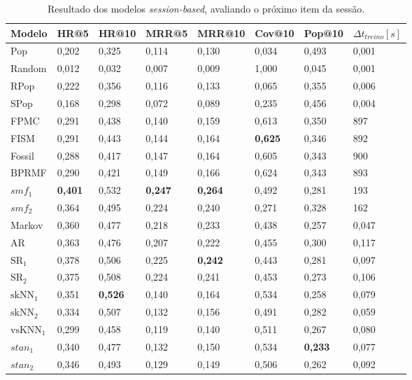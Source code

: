 \begin{table}
  \centering
  \begin{tabular}{|l|l|l|l|l|l|l|l|}
    \hline
    Modelo & HR@5 & HR@10 & MRR@5 & MRR@10 & Cov@10 & Pop@10 & $\Delta t_{treino} [s]$ \\
    \hline
    Pop & 0,202 & 0,325 & 0,114 & 0,130 & 0,034 & 0,493 & 0,001 \\
    \hline
    Random & 0,012 & 0,032 & 0,007 & 0,009 & 1,000 & 0,045 & 0,001 \\
    \hline
    RPop & 0,222 & 0,356 & 0,116 & 0,133 & 0,065 & 0,355 & 0,006 \\
    \hline
    SPop & 0,168 & 0,298 & 0,072 & 0,089 & 0,235 & 0,456 & 0,004 \\
    \hline
    FPMC & 0,291 & 0,438 & 0,140 & 0,159 & 0,613 & 0,350 & 897 \\
    \hline
    FISM & 0,291 & 0,443 & 0,144 & 0,164 & \textbf{0,625} & 0,346 & 892 \\
    \hline
    Fossil & 0,288 & 0,417 & 0,147 & 0,164 & 0,605 & 0,343 & 900 \\
    \hline
    BPRMF & 0,290 & 0,421 & 0,149 & 0,166 & 0,624 & 0,343 & 893 \\
    \hline
    $smf_{1}$ & \textbf{0,401} & 0,532 & \textbf{0,247} & \textbf{0,264} & 0,492 & 0,281 & 193 \\
    \hline
    $smf_{2}$ & 0,364 & 0,495 & 0,224 & 0,240 & 0,271 & 0,328 & 162 \\
    \hline
    Markov & 0,360 & 0,477 & 0,218 & 0,233 & 0,438 & 0,257 & 0,047 \\
    \hline
    AR & 0,363 & 0,476 & 0,207 & 0,222 & 0,455 & 0,300 & 0,117 \\
    \hline
    $\text{SR}_{1}$ & 0,378 & 0,506 & 0,225 & \textbf{0,242} & 0,443 & 0,281 & 0,097 \\
    \hline
    $\text{SR}_{2}$ & 0,375 & 0,508 & 0,224 & 0,241 & 0,453 & 0,273 & 0,106 \\
    \hline
    $\text{skNN}_{1}$ & 0,351 & \textbf{0,526} & 0,140 & 0,164 & 0,534 & 0,258 & 0,079 \\
    \hline
    $\text{skNN}_{2}$ & 0,334 & 0,507 & 0,132 & 0,156 & 0,491 & 0,282 & 0,059 \\
    \hline
    $\text{vsKNN}_{1}$ & 0,299 & 0,458 & 0,119 & 0,140 & 0,511 & 0,267 & 0,080 \\
    \hline
    $stan_{1}$ & 0,340 & 0,477 & 0,132 & 0,150 & 0,534 & \textbf{0,233} & 0,077 \\
    \hline
    $stan_{2}$ & 0,346 & 0,493 & 0,129 & 0,149 & 0,506 & 0,262 & 0,092 \\
    \hline
  \end{tabular}
  \caption{Resultado dos modelos \textit{session-based}, avaliando o próximo item da sessão. }
\end{table}

